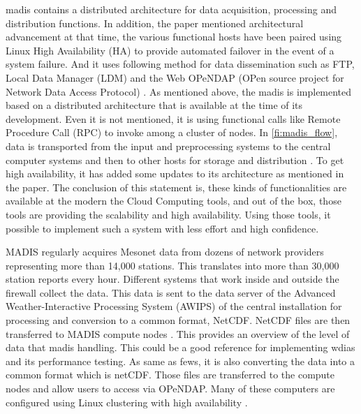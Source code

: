 \acrshort{madis} contains a distributed architecture for data acquisition, processing and distribution functions.
In addition, the paper mentioned architectural advancement at that time, the various functional hosts have been paired using Linux High Availability (HA) to provide automated failover in the event of a system failure. And it uses following method for data dissemination such as FTP, Local Data Manager (LDM) and the Web OPeNDAP (OPen source project for Network Data Access Protocol) \cite{Macdermaid2005ARCHITECTUREP2.39}. As mentioned above, the \acrshort{madis} is implemented based on a distributed architecture that is available at the time of its development. Even it is not mentioned, it is using functional calls like Remote Procedure Call (RPC) to invoke among a cluster of nodes. In \cref{fi:madis_flow}, data is transported from the input and preprocessing systems to the central computer systems and then to other hosts for storage and distribution \cite{Macdermaid2005ARCHITECTUREP2.39}. To get high availability, it has added some updates to its architecture as mentioned in the paper. The conclusion of this statement is, these kinds of functionalities are available at the modern the Cloud Computing tools, and out of the box, those tools are providing the scalability and high availability. Using those tools, it possible to implement such a system with less effort and high confidence.

MADIS regularly acquires Mesonet data from dozens of network providers representing more than 14,000 stations. This translates into more than 30,000 station reports every hour. Different systems that work inside and outside the firewall collect the data. This data is sent to the data server of the Advanced Weather-Interactive Processing System (AWIPS) of the central installation for processing and conversion to a common format, NetCDF. NetCDF files are then transferred to MADIS compute nodes \cite{Macdermaid2005ARCHITECTUREP2.39}. This provides an overview of the level of data that \acrshort{madis} handling. This could be a good reference for implementing \acrshort{wdias} and its performance testing. As same as \acrshort{fews}, it is also converting the data into a common format which is \acrshort{netCDF}. Those files are transferred to the compute nodes and allow users to access via OPeNDAP. 
Many of these computers are configured using Linux clustering with high availability \cite{Macdermaid2005ARCHITECTUREP2.39}.%

